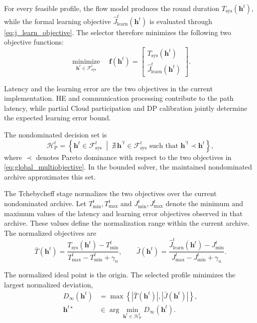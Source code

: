 \documentclass[5p,times]{elsarticle}
\theoremstyle{plain}
\theoremstyle{definition}
\theoremstyle{remark}
\begin{document}
For every feasible profile, the flow model produces the round duration $T_{\mathrm{sys}}(\mathbf h^t)$, while the formal learning objective $\widehat J_{\mathrm{learn}}^t(\mathbf h^t)$ is evaluated through \eqref{eq:j_learn_objective}. The selector therefore minimizes the following two objective functions:
\begin{equation}
\underset{\mathbf h^t\in\mathcal F_{\mathrm{sys}}^t}
{\operatorname{minimize}}
\quad
\mathbf f(\mathbf h^t)
=
\begin{bmatrix}
T_{\mathrm{sys}}(\mathbf h^t)\\
\widehat J_{\mathrm{learn}}^t(\mathbf h^t)
\end{bmatrix}.
\label{eq:global_multiobjective}
\end{equation}

Latency and the learning error are the two objectives in the current implementation. HE and communication processing contribute to the path latency, while partial Cloud participation and DP calibration jointly determine the expected learning error bound.

The nondominated decision set is
\begin{equation}
\mathcal H_{\mathrm P}^t
=
\left\{
\mathbf h^t\in\mathcal F_{\mathrm{sys}}^t
\;\middle|\;
\nexists\,\mathbf h^{\prime t}\in\mathcal F_{\mathrm{sys}}^t
\text{ such that }
\mathbf h^{\prime t}\prec\mathbf h^t
\right\},
\label{eq:pareto_front}
\end{equation}
where \(\prec\) denotes Pareto dominance with respect to the two objectives in \eqref{eq:global_multiobjective}. In the bounded solver, the maintained nondominated archive approximates this set.

The Tchebycheff stage normalizes the two objectives over the current nondominated archive. Let $T_{\min}^t,T_{\max}^t$ and $J_{\min}^t,J_{\max}^t$ denote the minimum and maximum values of the latency and learning error objectives observed in that archive. These values define the normalization range within the current archive. The normalized objectives are
\begin{equation}
\bar T(\mathbf h^t)
=
\frac{
T_{\mathrm{sys}}(\mathbf h^t)-T_{\min}^t
}{
T_{\max}^t-T_{\min}^t+\gamma_n
},
\qquad
\bar J(\mathbf h^t)
=
\frac{
\widehat J_{\mathrm{learn}}^t(\mathbf h^t)-J_{\min}^t
}{
J_{\max}^t-J_{\min}^t+\gamma_n
}.
\label{eq:pareto_normalization}
\end{equation}

The normalized ideal point is the origin. The selected profile minimizes the largest normalized deviation,
\begin{equation}
\begin{aligned}
D_\infty(\mathbf h^t)
&=
\max\left\{
\left|\bar T(\mathbf h^t)\right|,
\left|\bar J(\mathbf h^t)\right|
\right\},
\\
\mathbf h^{t\star}
&\in
\arg\min_{\mathbf h^t\in\mathcal H_{\mathrm P}^t}
D_\infty(\mathbf h^t).
\end{aligned}
\label{eq:selection}
\end{equation}
\end{document}
